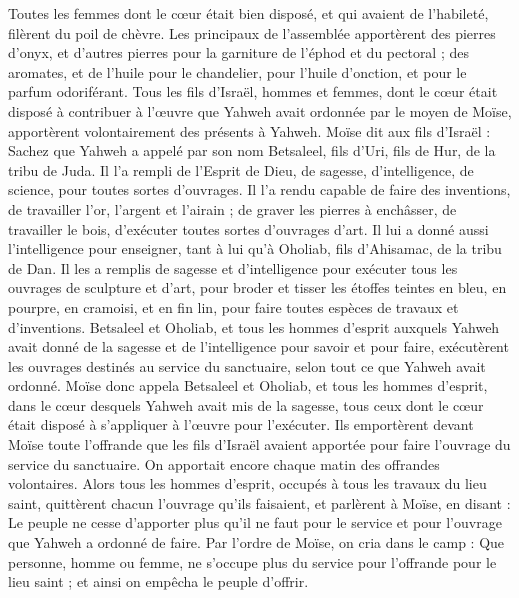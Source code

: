 \begin{multicols}{2}
Toutes les femmes dont le cœur était bien disposé, et qui avaient de l’habileté, filèrent du poil de chèvre.
Les principaux de l'assemblée apportèrent des pierres d'onyx, et d’autres pierres pour la garniture de l'éphod et du pectoral ;
des aromates, et de l'huile pour le chandelier, pour l'huile d'onction, et pour le parfum odoriférant.
Tous les fils d’Israël, hommes et femmes, dont le cœur était disposé à contribuer à l’œuvre que Yahweh avait ordonnée par le moyen de Moïse, apportèrent volontairement des présents à Yahweh.
Moïse dit aux fils d'Israël : Sachez que Yahweh a appelé par son nom Betsaleel, fils d'Uri, fils de Hur, de la tribu de Juda.
Il l'a rempli de l'Esprit de Dieu, de sagesse, d’intelligence, de science, pour toutes sortes d'ouvrages.
Il l’a rendu capable de faire des inventions, de travailler l’or, l’argent et l’airain ;
de graver les pierres à enchâsser, de travailler le bois, d’exécuter toutes sortes d’ouvrages d’art.
Il lui a donné aussi l’intelligence pour enseigner, tant à lui qu'à Oholiab, fils d'Ahisamac, de la tribu de Dan.
Il les a remplis de sagesse et d’intelligence pour exécuter tous les ouvrages de sculpture et d’art, pour broder et tisser les étoffes teintes en bleu, en pourpre, en cramoisi, et en fin lin, pour faire toutes espèces de travaux et d’inventions.
\VerseOne{}Betsaleel et Oholiab, et tous les hommes d'esprit auxquels Yahweh avait donné de la sagesse et de l'intelligence pour savoir et pour faire, exécutèrent les ouvrages destinés au service du sanctuaire, selon tout ce que Yahweh avait ordonné.
Moïse donc appela Betsaleel et Oholiab, et tous les hommes d'esprit, dans le cœur desquels Yahweh avait mis de la sagesse, tous ceux dont le cœur était disposé à s’appliquer à l’œuvre pour l’exécuter.
Ils emportèrent devant Moïse toute l'offrande que les fils d'Israël avaient apportée pour faire l'ouvrage du service du sanctuaire. On apportait encore chaque matin des offrandes volontaires.
Alors tous les hommes d’esprit, occupés à tous les travaux du lieu saint, quittèrent chacun l’ouvrage qu’ils faisaient,
et parlèrent à Moïse, en disant : Le peuple ne cesse d'apporter plus qu'il ne faut pour le service et pour l'ouvrage que Yahweh a ordonné de faire.
Par l’ordre de Moïse, on cria dans le camp : Que personne, homme ou femme, ne s’occupe plus du service pour l'offrande pour le lieu saint ; et ainsi on empêcha le peuple d'offrir.

\end{multicols}
